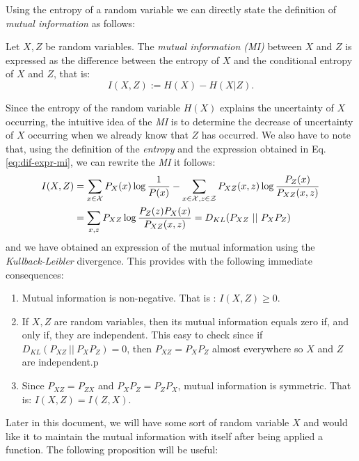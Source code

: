 

Using the entropy of a random variable we can directly state the definition of \emph{mutual information} as follows:

\begin{ndef}
Let $X,Z$ be random variables. The \emph{mutual information (MI)} between $X$ and $Z$ is expressed as the difference between the entropy of $X$ and the conditional entropy of $X$ and $Z$, that is:
$$
I(X,Z) := H(X) - H(X|Z).
$$
\end{ndef}

Since the entropy of the random variable $H(X)$ explains the uncertainty of $X$ occurring, the intuitive idea of the \emph{MI} is to determine the decrease of uncertainty of $X$ occurring when we already
know that $Z$ has occurred. We also have to note that, using the definition of the \emph{entropy} and the expression obtained in Eq. \ref{eq:dif-expr-mi}, we can rewrite the \emph{MI}  it follows:
\begin{align*}
I(X,Z) & = \sum_{x \in \mathcal{X}}P_X(x) \log \frac{1}{P(x)} - \sum_{x \in \mathcal{X}, z \in \mathcal Z} P_{XZ}(x,z) \log \frac{P_Z(x)}{P_{XZ}(x,z)} \\  & = \sum_{x,z}P_{XZ}\log \frac{P_Z(z)P_X(x)}{P_{XZ}(x,z)} = D_{KL}(P_{XZ} \ || \ P_X P_Z)
\end{align*}
and we have obtained an expression of the mutual information using the \emph{Kullback-Leibler} divergence. This provides with the following immediate consequences:
\begin{enumerate}[label=$(\roman*)$]
\item Mutual information is non-negative. That is : $I(X,Z) \geq 0$.
\item If $X,Z$ are random variables, then its mutual information equals zero if, and only if, they are independent. 
This easy to check since if $D_{KL}(P_{XZ} \ || \ P_X P_Z) = 0$, then $P_{XZ} = P_X P_Z$ almost everywhere so $X$ and $Z$ are independent.p
\item Since $P_{XZ} = P_{ZX}$ and $P_X P_Z = P_Z P_X$, mutual information is symmetric. That is: $I(X,Z) = I(Z,X)$.
\end{enumerate}

Later in this document, we will have some sort of random variable $X$ and would like it to maintain the mutual information with itself after being applied a function. The following proposition will be useful:

